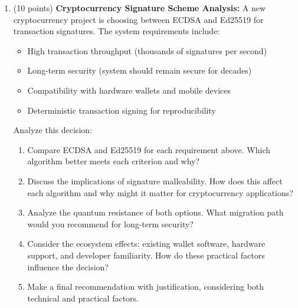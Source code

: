 \documentclass[10pt,a4paper,american]{exam}
\begin{document}
\begin{enumerate}
	\item (10 points) \textbf{Cryptocurrency Signature Scheme Analysis:}
	      A new cryptocurrency project is choosing between ECDSA and Ed25519 for transaction signatures. The system requirements include:
	      \begin{itemize}
		      \item High transaction throughput (thousands of signatures per second)
		      \item Long-term security (system should remain secure for decades)
		      \item Compatibility with hardware wallets and mobile devices
		      \item Deterministic transaction signing for reproducibility
	      \end{itemize}
	      Analyze this decision:
	      \begin{enumerate}
		      \item Compare ECDSA and Ed25519 for each requirement above. Which algorithm better meets each criterion and why?
		      \item Discuss the implications of signature malleability. How does this affect each algorithm and why might it matter for cryptocurrency applications?
		      \item Analyze the quantum resistance of both options. What migration path would you recommend for long-term security?
		      \item Consider the ecosystem effects: existing wallet software, hardware support, and developer familiarity. How do these practical factors influence the decision?
		      \item Make a final recommendation with justification, considering both technical and practical factors.
	      \end{enumerate}


\end{enumerate}
\end{document}
